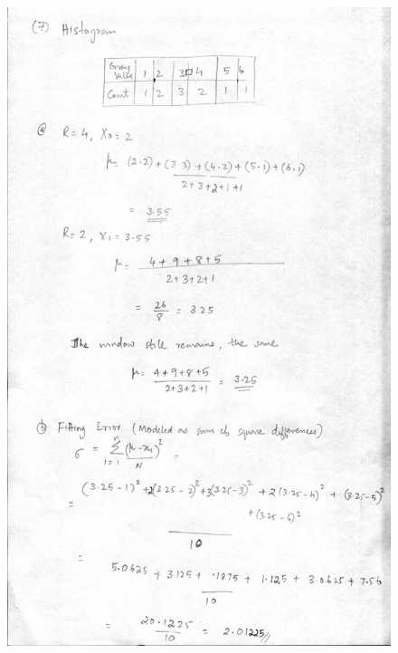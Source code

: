 \documentclass{article}
\begin{document}
\begin{figure}
\includegraphics[width=15cm]{qn7_1.jpg}
\end{figure}
\end{document}
